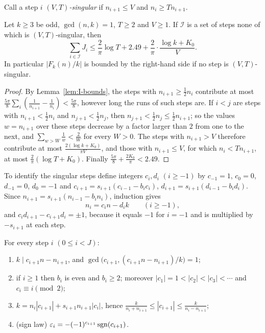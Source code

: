 Call a step $i$ \emph{$(V,T)$-singular} if $n_{i+1}\le V$ and $n_i\ge Tn_{i+1}$.

\begin{proposition}\label{prop:bounded}
Let $k\ge3$ be odd, $\gcd(n,k)=1$, $T\ge2$ and $V\ge1$. If $\mathcal I$ is a set of steps none of which is $(V,T)$-singular, then
\[
\sum_{i\in\mathcal I}J_i\le\frac2\pi\log T+2.49+\frac2\pi\cdot\frac{\log k+K_0}V.
\]
In particular $|F_k(n)/k|$ is bounded by the right-hand side if no step is $(V,T)$-singular.
\end{proposition}

\begin{proof}
By Lemma~\ref{lem:I-bounds}, the steps with $n_{i+1}\ge\frac12n_i$ contribute at most $\frac{5\pi}8\sum_i(\frac1{n_{i+1}}-\frac1{n_i})<\frac{5\pi}8$, however long the runs of such steps are. If $i<j$ are steps with $n_{i+1}<\frac12n_i$ and $n_{j+1}<\frac12n_j$, then $n_{j+1}<\frac12n_j\le\frac12n_{i+1}$; so the values $w=n_{i+1}$ over these steps decrease by a factor larger than $2$ from one to the next, and $\sum_{w>W}\frac1w<\frac2W$ for every $W>0$. The steps with $n_{i+1}>V$ therefore contribute at most $\frac{2(\log k+K_0)}{\pi V}$, and those with $n_{i+1}\le V$, for which $n_i<Tn_{i+1}$, at most $\frac2\pi(\log T+K_0)$. Finally $\frac{5\pi}8+\frac{2K_0}\pi<2.49$.
\end{proof}

To identify the singular steps define integers $c_i,d_i$ $(i\ge-1)$ by $c_{-1}=1$, $c_0=0$, $d_{-1}=0$, $d_0=-1$ and $c_{i+1}=s_{i+1}(c_{i-1}-b_ic_i)$, $d_{i+1}=s_{i+1}(d_{i-1}-b_id_i)$. Since $n_{i+1}=s_{i+1}(n_{i-1}-b_in_i)$, induction gives
\begin{equation}\label{eq:linear-form}
n_i=c_in-d_ik\qquad(i\ge-1),
\end{equation}
and $c_id_{i+1}-c_{i+1}d_i=\pm1$, because it equals $-1$ for $i=-1$ and is multiplied by $-s_{i+1}$ at each step.

\begin{proposition}\label{prop:steps}
For every step $i$ $(0\le i<J)$:
\begin{enumerate}[label=\upshape(\alph*),leftmargin=*,nosep]
\item $k\mid c_{i+1}n-n_{i+1}$, and $\gcd\bigl(c_{i+1},(c_{i+1}n-n_{i+1})/k\bigr)=1$;
\item if $i\ge1$ then $b_i$ is even and $b_i\ge2$; moreover $|c_1|=1<|c_2|<|c_3|<\cdots$ and $c_i\equiv i\pmod2$;
\item $k=n_i|c_{i+1}|+s_{i+1}n_{i+1}|c_i|$, hence $\frac k{n_i+n_{i+1}}\le|c_{i+1}|\le\frac k{n_i-n_{i+1}}$;
\item \textup{(sign law)} $\varepsilon_i=-(-1)^{c_{i+1}}\operatorname{sgn}(c_{i+1})$.
\end{enumerate}
\end{proposition}


